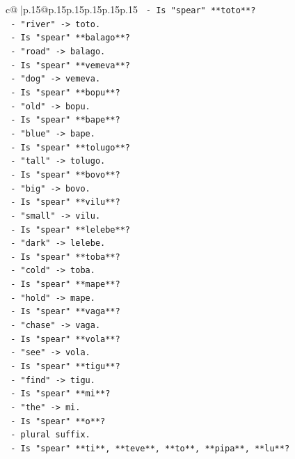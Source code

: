 \documentclass{article}
\begin{document}
{\begin{supertabular}{c@{$\;$}|p{.15\linewidth}@{}p{.15\linewidth}p{.15\linewidth}p{.15\linewidth}p{.15\linewidth}p{.15\linewidth}}
{{{\texttt{    {-} Is "spear" **toto**?} \\
\texttt{      {-} "river" {-}> toto.} \\
\texttt{    {-} Is "spear" **balago**?} \\
\texttt{      {-} "road" {-}> balago.} \\
\texttt{    {-} Is "spear" **vemeva**?} \\
\texttt{      {-} "dog" {-}> vemeva.} \\
\texttt{    {-} Is "spear" **bopu**?} \\
\texttt{      {-} "old" {-}> bopu.} \\
\texttt{    {-} Is "spear" **bape**?} \\
\texttt{      {-} "blue" {-}> bape.} \\
\texttt{    {-} Is "spear" **tolugo**?} \\
\texttt{      {-} "tall" {-}> tolugo.} \\
\texttt{    {-} Is "spear" **bovo**?} \\
\texttt{      {-} "big" {-}> bovo.} \\
\texttt{    {-} Is "spear" **vilu**?} \\
\texttt{      {-} "small" {-}> vilu.} \\
\texttt{    {-} Is "spear" **lelebe**?} \\
\texttt{      {-} "dark" {-}> lelebe.} \\
\texttt{    {-} Is "spear" **toba**?} \\
\texttt{      {-} "cold" {-}> toba.} \\
\texttt{    {-} Is "spear" **mape**?} \\
\texttt{      {-} "hold" {-}> mape.} \\
\texttt{    {-} Is "spear" **vaga**?} \\
\texttt{      {-} "chase" {-}> vaga.} \\
\texttt{    {-} Is "spear" **vola**?} \\
\texttt{      {-} "see" {-}> vola.} \\
\texttt{    {-} Is "spear" **tigu**?} \\
\texttt{      {-} "find" {-}> tigu.} \\
\texttt{    {-} Is "spear" **mi**?} \\
\texttt{      {-} "the" {-}> mi.} \\
\texttt{    {-} Is "spear" **o**?} \\
\texttt{      {-} plural suffix.} \\
\texttt{    {-} Is "spear" **ti**, **teve**, **to**, **pipa**, **lu**?} \\
}}}
\end{supertabular}}
\end{document}
